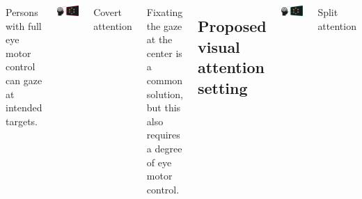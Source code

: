 \documentclass[25pt, a0paper, landscape]{tikzposter}
\begin{document}
\begin{columns}
{\begin{minipage}{.48\linewidth}
			Persons with full eye motor control can gaze at intended targets.
		\end{minipage}%
		\bigskip
		\bigskip


		\begin{minipage}{.48\linewidth}
			\includegraphics[width=\linewidth]{figures/attention_covert.pdf}
		\end{minipage}%
		\hfill%
		\begin{minipage}{.48\linewidth}
			\begin{tcolorbox}[sharp corners=all,
					colback=GeoDataViz_magenta,coltext=white,
					fontupper=\bfseries,boxrule=0mm,boxsep=5mm,
				]
				Covert attention
			\end{tcolorbox}

			Fixating the gaze at the center is a common solution, but this also requires a degree of eye motor control.
		\end{minipage}%
		\bigskip
		\bigskip

		\subsection*{\color{black} Proposed visual attention setting}


		\begin{minipage}{.48\linewidth}
			\includegraphics[width=\linewidth]{figures/attention_split.pdf}
		\end{minipage}%
		\hfill%
		\begin{minipage}{.48\linewidth}
			\begin{tcolorbox}[sharp corners=all,
					colback=GeoDataViz_green,coltext=white,
					fontupper=\bfseries,boxrule=0mm,boxsep=5mm,
				]
				Split attention
			\end{tcolorbox}


\end{minipage}}
\end{columns}
\end{document}
